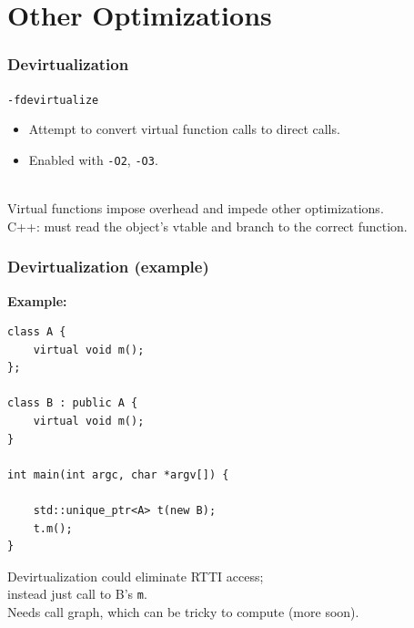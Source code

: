 \documentclass[aspectratio=43]{beamer}
\newenvironment{changemargin}[1]{%
  \begin{list}{}{%
    \setlength{\topsep}{0pt}%
    \setlength{\leftmargin}{#1}%
    \setlength{\rightmargin}{1em}
    \setlength{\listparindent}{\parindent}%
    \setlength{\itemindent}{\parindent}%
    \setlength{\parsep}{\parskip}%
  }%
  \item[]}{\end{list}}
\begin{document}
\section{Other Optimizations}
\begin{frame}
  \frametitle{Devirtualization}

  \begin{changemargin}{2cm}
  {\tt -fdevirtualize}

  \begin{itemize}
    \item Attempt to convert virtual function calls to direct calls.
    \item Enabled with {\tt -O2}, {\tt -O3}.
  \end{itemize}
~\\[1em]

  Virtual functions impose overhead and impede other optimizations.\\[1em]
  C++: must read
  the object's vtable and branch to
  the correct function.
  \end{changemargin}
\end{frame}

\begin{frame}[fragile]
  \frametitle{Devirtualization (example)}
  \begin{changemargin}{2cm}

  {\bf Example:}

  \begin{lstlisting}
class A {
    virtual void m();
};

class B : public A {
    virtual void m();
}

int main(int argc, char *argv[]) {

    std::unique_ptr<A> t(new B);
    t.m();
}
  \end{lstlisting}
  Devirtualization could eliminate RTTI access; \\ \qquad instead just call to B's {\tt m}.\\
  Needs call graph, which can be tricky to compute (more soon).
  \end{changemargin}
\end{frame}
\end{document}
